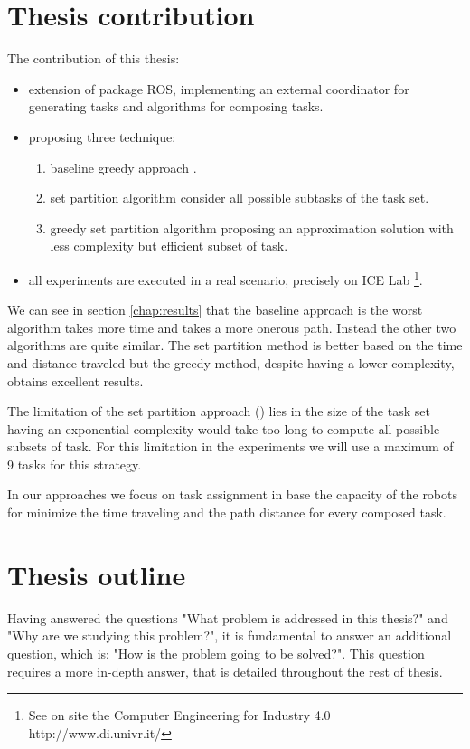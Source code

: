 \newpage
\section{Thesis contribution}
The contribution of this thesis:
\begin{itemize}
    \item extension of package ROS, implementing an external coordinator for generating tasks and algorithms for composing tasks.
    \item proposing three technique: 
    \begin{enumerate}
        \item baseline greedy approach \srst.
        \item set partition algorithm \sps consider all possible subtasks of the task set.
        \item greedy set partition algorithm \gsp proposing an approximation solution with less complexity but efficient subset of task.
    \end{enumerate}
    \item all experiments are executed in a real scenario, precisely on ICE Lab \footnote{See on site the Computer Engineering for Industry 4.0 http://www.di.univr.it/}. 
\end{itemize}

We can see in section \ref{chap:results} that the baseline approach is
the worst algorithm takes more time and takes a more onerous path.
Instead the other two algorithms are quite similar. 
The set partition method is better based on the time and distance traveled but the greedy method,
despite having a lower complexity, obtains excellent results.

The limitation of the set partition approach (\sps) lies in the size of the task set having an exponential complexity
would take too long to compute all possible subsets of task.
For this limitation in the experiments we will use a maximum of 9 tasks for this strategy. 

In our approaches we focus on task assignment in base the capacity of the robots for minimize the time traveling and the path distance for every composed task. 

\newpage
\section{Thesis outline}


Having answered the questions "What problem is addressed in this thesis?" and 
"Why are we studying this problem?", it is fundamental to answer an additional question,
which is: "How is the problem going to be solved?". This question requires a more 
in-depth answer, that is detailed throughout the rest of thesis.

